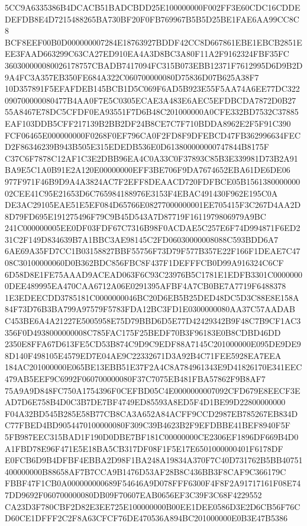 \documentclass[UTF8,fontset=fandol,zihao=-4,a4paper]{ctexart}
\begin{document}
{{5CC9A6335386B4DCACB51BADCBDD25E100000000F002FF3E60CDC16CDDEDEFDB8E4D7215488265BA730BF20F0FB769967B5B5D25BE1FAE6AA99CC8C8
BCF8EEF00B0D000000007284E18763927BDDF42CC8D667861EBE1EBCB2851EEE3FAAD663299C63CA27ED910EA4A3D8BC3A80F11A2F9162324FBF35FC
360300000080026178757CBADB7417094FC315B073EBB12371F7612995D6D9B2D9A4FC3A357EB350FE684A322C060700000080D75836D07B625A38F7
10D357891F5EFAFDEB145BCB1D5C069F6AD5B923E55F5AA74A6EE77DC322090700000080477B4AA0F7E5C0305ECAE3A483E6AEC5EFDBCDA7872D0B27
55A8467E78DC5CFDF0EA93551F7D6B48C201000000A0CFE332BD7532C37885EAF103DDB5CFF217139B2BB2DF24B8CE7C7F710BDDA8962E2F5F91C390
FCF06465E000000000F0268F0EF796CA0F2FD8F9DFEBCD47FB362996634FECD2F86346239B943B505E315EDEDB536E0D613800000000747844B8175F
C37C6F7878C12AF1C3E2DBB96EA4C0A33C0F37893C85B3E339981D73B2A91BA9E5C1A0B91E2A120E00000000EFF3BE706F9DA7674652EBA61DE6DE06
977F971F46B9D9A4A3824AC7F2EFF8DEAACD720FDFBCE05B156138000000002CEE41C95E21653D6C765984188976E3153F4EBAC491430F962E195C0A
DE3AC29105EAE51E5EF084D65766E08277000000001EE705415F3C267D4AA2D8D79FD695E191275496F79C9B45D543A7D87719F1611979806979A9BC
241C000000005EE0DF03FDF67C7316B98F0ACDAE5C257E6F74D994871F6ED231C2F149D834639B7A1BBC3AE98145C2FD06030000008088C593BDD6A7
6AE69A35FD7CC1B03158827BBF55756F73D79F577B357E22F166F1DEAE7C4708C30100000060D0B362BDC856FBC8F437F1DEFFFCB0D99A916324C6CF
6D58D8E1FE75AAAD9ACEAD063F6C93C23976B5C1781E1EDFB3301C00000000DEE489995EA470CAA6712A06E0291395AFBF4A7CB0BE7A7719F6488378
1E3EDEECDD3785181C0000000046BC20D6EB5B25DED48DC5D3C88E8E158A84F73D76B3BA799A97579F5783FDA12BC3FD1E0300000080AA37C57AADAB
C453BE6A4A21227E5005958E75D79BBD6D5E77D42429342B9F48C7B9CF1AC3356F0D4938000000008C785FAC175F25BEDF70B3F96183E0B8CDBD46DD
2350E8FFA67D613FE5CD53B874C9D9C9EDF88A7145C201000000E095DE9DE98D140F498105E4579ED7E04AE9C22332671D3A92B4C71FEE5928EA7EEA
184AC201000000E065BE13EBB51E37F2A4C8A784961343E9D41826170E341EEC479AB5EEF9C6992F060700000080F37C7075EB481FBA57862F9B8AF7
75A9A9D848FC750A1754396F0CEFBD05C4E0000000007092CFD679E8EECF3EAD7D6E758B4D0C3B7DE7BF4749ED85593A8ED5F4D1BE99D22800000000
F04A32BD545B285E58B77CB8CA3A652A84ACFF9CCD2987EB785267EB834DC77FBED4BD9054470100000080F309C39B4623B2F9EFDBBE41BEF8940F5F
5FB987EEC315BAD1F190D0DBE7BF181C00000000CE2306EF1896DF669B4D0A1FBD78E96F471E5E18BA5CB317DF08F1F5E17E6501000000401F6178DF
E0FCB6D9B4DFBF4EBBA2D98F1BA248A19834A370F7C40D731762B5BB40751400000000B88658AF7B7CCA9B1476D53AF28B8C436BB3F8CAF9C366179C
FBBF47F1CB0A000000000689F54646A9D078FFF6300F4F8F2A91717161F08E747DD9692F060700000080DB09F70607EAB0656EF3C39F3C68F4229552
CA23D3F780CBF2D82E3EE725E100000000B00EE1DEE0586D3E2D6CB56F76CD60CE1DFFF2C2F8A63CFCF76DE470536A894BC201000000E0B3E47B5386
}}
\end{document}
